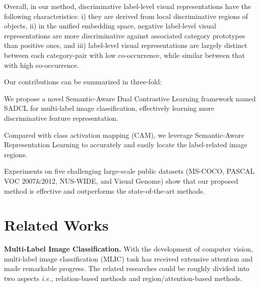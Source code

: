 \documentclass{ecai}
\def\ie{{\em i.e.}}
\begin{document}
Overall, in our method, discriminative label-level visual representations have the following characteristics:  i) they are derived from local discriminative regions of objects, ii) in the unified embedding space, negative label-level visual representations are more discriminative against associated category prototypes than positive ones, and iii) label-level visual representations are largely distinct between each category-pair with low co-occurrence, while similar between that with high co-occurrence.

Our contributions can be summarized in three-fold:

 We propose a novel Semantic-Aware Dual Contrastive Learning framework named SADCL for multi-label image classification, effectively learning more discriminative feature representation.

 Compared with class activation mapping (CAM), we leverage Semantic-Aware Representation Learning to accurately and easily locate the label-related image regions.

 Experiments on five challenging large-scale public datasets (MS-COCO, PASCAL VOC 2007\&2012, NUS-WIDE, and Visual Genome) show that our proposed method is effective and outperforms the state-of-the-art methods.

\vspace{-0.1cm}
\section{Related Works}
\textbf{Multi-Label Image Classification.} With the development of computer vision, multi-label image
classification (MLIC) task has received extensive attention and made remarkable progress. The related researches could be roughly divided into two aspects \ie{}, relation-based methods and region/attention-based methods.
\end{document}
